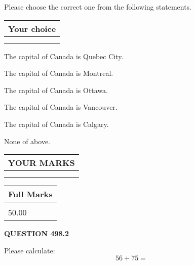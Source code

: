 \documentclass[12pt]{article}
\begin{document}
  
Please choose the correct one from the following statements.
  
  
\noindent\hspace{3.0in} \begin{tabular}{|l|}
\hline
Your choice \\
\hline
 \\ 
 \\ 
\hline
\end{tabular}
  
  
 
 
The capital of Canada is Quebec City.
 
 
The capital of Canada is Montreal.
 
 
The capital of Canada is Ottawa.
 
 
The capital of Canada is Vancouver.
 
 
The capital of Canada is Calgary.
 
 
 None of above.
 
 
  
\vspace{0.2in}
  
\noindent\begin{tabular}{|l|}
\hline
 YOUR MARKS  \\
\hline
 \\ 
 \\ 
\hline
\end{tabular}
\hspace{0.05in} \begin{tabular}{|l|}
\hline
 Full Marks  \\
\hline
 \\ 
50.00 \\
\hline
\end{tabular}
{\textbf{\Large{QUESTION
498.2 
}}}
  
  
 
Please calculate:
\begin{equation}
56 +  %
75 = \nonumber
\end{equation}
 

 

 
   
   
 \vspace{0.2in}
 
   
   
   
   
\end{document}
